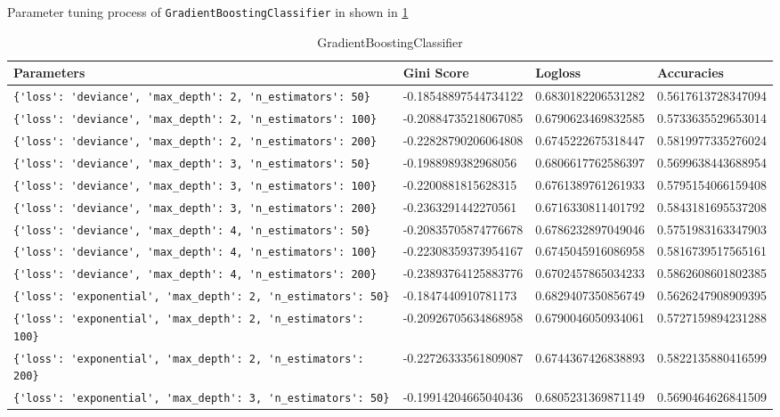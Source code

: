 Parameter tuning process of \verb|GradientBoostingClassifier| in shown in \cref{pt:GradientBoostingClassifier} 

\begin{table} \centering
\caption{GradientBoostingClassifier} 
\label{pt:GradientBoostingClassifier} 
\begin{tabular}{llll}\toprule\bfseries Parameters & \bfseries Gini Score & \bfseries Logloss &\bfseries Accuracies \\\midrule 
\verb|{'loss': 'deviance', 'max_depth': 2, 'n_estimators': 50}| & -0.18548897544734122 & 0.6830182206531282 & 0.5617613728347094 \\ 
\verb|{'loss': 'deviance', 'max_depth': 2, 'n_estimators': 100}| & -0.20884735218067085 & 0.6790623469832585 & 0.5733635529653014 \\ 
\verb|{'loss': 'deviance', 'max_depth': 2, 'n_estimators': 200}| & -0.22828790206064808 & 0.6745222675318447 & 0.5819977335276024 \\ 
\verb|{'loss': 'deviance', 'max_depth': 3, 'n_estimators': 50}| & -0.1988989382968056 & 0.6806617762586397 & 0.5699638443688954 \\ 
\verb|{'loss': 'deviance', 'max_depth': 3, 'n_estimators': 100}| & -0.2200881815628315 & 0.6761389761261933 & 0.5795154066159408 \\ 
\verb|{'loss': 'deviance', 'max_depth': 3, 'n_estimators': 200}| & -0.2363291442270561 & 0.6716330811401792 & 0.5843181695537208 \\ 
\verb|{'loss': 'deviance', 'max_depth': 4, 'n_estimators': 50}| & -0.20835705874776678 & 0.6786232897049046 & 0.5751983163347903 \\ 
\verb|{'loss': 'deviance', 'max_depth': 4, 'n_estimators': 100}| & -0.22308359373954167 & 0.6745045916086958 & 0.5816739517565161 \\ 
\verb|{'loss': 'deviance', 'max_depth': 4, 'n_estimators': 200}| & -0.23893764125883776 & 0.6702457865034233 & 0.5862608601802385 \\ 
\verb|{'loss': 'exponential', 'max_depth': 2, 'n_estimators': 50}| & -0.1847440910781173 & 0.6829407350856749 & 0.5626247908909395 \\ 
\verb|{'loss': 'exponential', 'max_depth': 2, 'n_estimators': 100}| & -0.20926705634868958 & 0.6790046050934061 & 0.5727159894231288 \\ 
\verb|{'loss': 'exponential', 'max_depth': 2, 'n_estimators': 200}| & -0.22726333561809087 & 0.6744367426838893 & 0.5822135880416599 \\ 
\verb|{'loss': 'exponential', 'max_depth': 3, 'n_estimators': 50}| & -0.19914204665040436 & 0.6805231369871149 & 0.5690464626841509 \\ 

\end{tabular}
\end{table}

